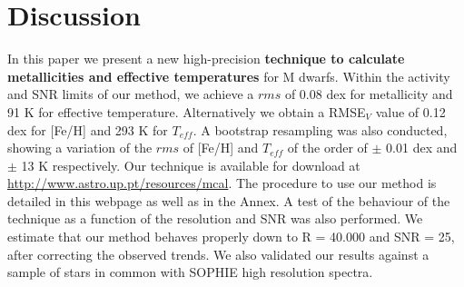 \documentclass[referee]{aa}
\begin{document}






\section{Discussion}
\label{sec:discussion}

In this paper we present a new high-precision \textbf{technique to calculate metallicities and effective temperatures} for M dwarfs. Within the activity and SNR limits of our method, we achieve a $rms$ of 0.08 dex for metallicity and 91 K for effective temperature. Alternatively we obtain a RMSE$_{V}$ value of 0.12 dex for [Fe/H] and 293 K for $T_{eff}$. A bootstrap resampling was also conducted, showing a variation of the $rms$ of [Fe/H] and $T_{eff}$ of the order of $\pm$ 0.01 dex and $\pm$ 13 K respectively. Our technique is available for download at \url{http://www.astro.up.pt/resources/mcal}. The procedure to use our method is detailed in this webpage as well as in the Annex. A test of the behaviour of the technique as a function of the resolution and SNR was also performed. We estimate that our method behaves properly down to R = 40.000 and SNR = 25, after correcting the observed trends. We also validated our results against a sample of stars in common with SOPHIE high resolution spectra.

\end{document}
